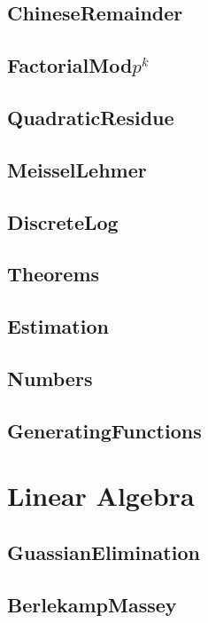 	\subsection{ChineseRemainder}
	
	\subsection{FactorialMod$p^k$}
	
	\subsection{QuadraticResidue}
	
	\subsection{MeisselLehmer}
	
	\subsection{DiscreteLog}
	
	\subsection{Theorems}
	
	\subsection{Estimation}
	
	\subsection{Numbers}
	
	\subsection{GeneratingFunctions}
	
\section{Linear Algebra}
	\subsection{GuassianElimination}
	
	\subsection{BerlekampMassey}
	
